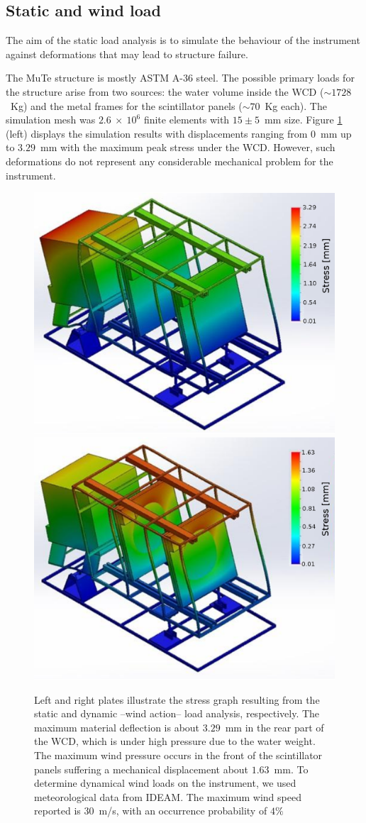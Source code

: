 \documentclass[letterpaper,11pt]{article}
\begin{document}
\subsection{Static and wind load}
The aim of the static load analysis is to simulate the behaviour of the instrument against deformations that may lead to structure failure.

The MuTe structure is mostly ASTM A-36 steel. The possible primary loads for the structure arise from two sources: the water volume inside the WCD ($\sim 1728$~Kg) and the metal frames for the scintillator panels ($\sim 70$~Kg each). The simulation mesh was $2.6~\times~10^6$ finite elements with $15 \pm 5$~mm size. Figure \ref{fig:stress} (left) displays the simulation results with displacements ranging from  $0$~mm up to $3.29$~mm with the maximum peak stress under the WCD. However, such deformations do not represent any considerable mechanical problem for the instrument.
\begin{figure}[htb]
\centering
\includegraphics[width=0.48\columnwidth]{Figures/stress_graph.eps}
\includegraphics[width=0.48\columnwidth]{Figures/stress_graph_wind.eps}
\caption{Left and right plates illustrate the stress graph resulting from the static and dynamic --wind action-- load analysis, respectively. The maximum material deflection is about $3.29$~mm in the rear part of the WCD, which is under high pressure due to the water weight.  The maximum wind pressure occurs in the front of the scintillator panels suffering a mechanical displacement about $1.63$~mm. To determine dynamical wind loads on the instrument, we used meteorological data from IDEAM. The maximum wind speed reported is $30$~m/s, with an occurrence probability of $4\%$}
\label{fig:stress}
\end{figure}
\end{document}
